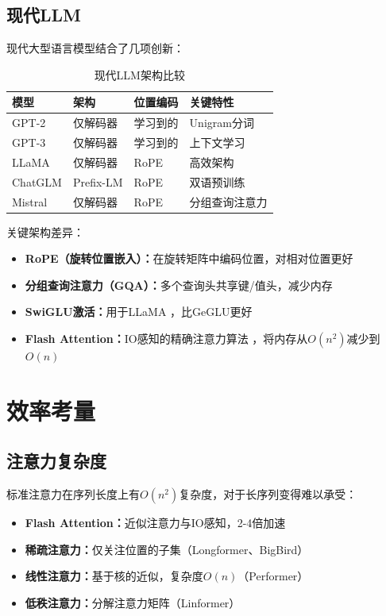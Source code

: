 \subsection{现代LLM}

现代大型语言模型结合了几项创新：

\begin{table}[ht]
    \centering
    \caption{现代LLM架构比较}
    \begin{tabular}{L{2.5cm} L{3cm} L{3cm} L{3cm}}
        \toprule
        \textbf{模型} & \textbf{架构} & \textbf{位置编码} & \textbf{关键特性} \\
        \midrule
        GPT-2 & 仅解码器 & 学习到的 & Unigram分词 \\
        GPT-3 & 仅解码器 & 学习到的 & 上下文学习 \\
        LLaMA & 仅解码器 & RoPE & 高效架构 \\
        ChatGLM & Prefix-LM & RoPE & 双语预训练 \\
        Mistral & 仅解码器 & RoPE & 分组查询注意力 \\
        \bottomrule
    \end{tabular}
\end{table}

关键架构差异：
\begin{itemize}
    \item \textbf{RoPE（旋转位置嵌入）：}在旋转矩阵中编码位置，对相对位置更好
    \item \textbf{分组查询注意力（GQA）：}多个查询头共享键/值头，减少内存
    \item \textbf{SwiGLU激活：}用于LLaMA \cite{touvron2023llama}，比GeGLU更好
    \item \textbf{Flash Attention：}IO感知的精确注意力算法 \cite{dao2022flashattention}，将内存从$O(n^2)$减少到$O(n)$
\end{itemize}

\section{效率考量}

\subsection{注意力复杂度}

标准注意力在序列长度上有$O(n^2)$复杂度，对于长序列变得难以承受：

\begin{itemize}
    \item \textbf{Flash Attention：}近似注意力与IO感知，2-4倍加速
    \item \textbf{稀疏注意力：}仅关注位置的子集（Longformer、BigBird）
    \item \textbf{线性注意力：}基于核的近似，复杂度$O(n)$（Performer）
    \item \textbf{低秩注意力：}分解注意力矩阵（Linformer）
\end{itemize}

